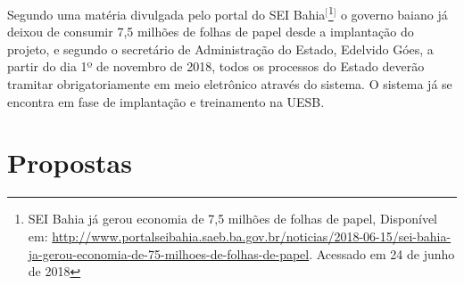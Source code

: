 Segundo uma matéria divulgada pelo portal do SEI Bahia$^{[}$\footnote{SEI Bahia já gerou economia de 7,5 milhões de folhas de papel, Disponível em: \url{http://www.portalseibahia.saeb.ba.gov.br/noticias/2018-06-15/sei-bahia-ja-gerou-economia-de-75-milhoes-de-folhas-de-papel}.  Acessado em 24 de junho de 2018}$^{]}$ o governo baiano já deixou de consumir 7,5 milhões de folhas de papel desde a implantação do projeto, e segundo o secretário de Administração do Estado, Edelvido Góes, a partir do dia 1º de novembro de 2018, todos os processos do Estado deverão tramitar obrigatoriamente em meio eletrônico através do sistema. O sistema já se encontra em fase de implantação e treinamento na UESB.

\section{Propostas}

\lipsum[3]